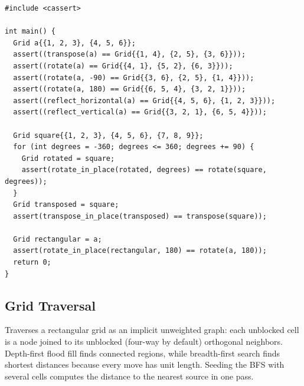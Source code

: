 \begin{lstlisting}[style=cpp]
#include <cassert>

int main() {
  Grid a{{1, 2, 3}, {4, 5, 6}};
  assert((transpose(a) == Grid{{1, 4}, {2, 5}, {3, 6}}));
  assert((rotate(a) == Grid{{4, 1}, {5, 2}, {6, 3}}));
  assert((rotate(a, -90) == Grid{{3, 6}, {2, 5}, {1, 4}}));
  assert((rotate(a, 180) == Grid{{6, 5, 4}, {3, 2, 1}}));
  assert((reflect_horizontal(a) == Grid{{4, 5, 6}, {1, 2, 3}}));
  assert((reflect_vertical(a) == Grid{{3, 2, 1}, {6, 5, 4}}));

  Grid square{{1, 2, 3}, {4, 5, 6}, {7, 8, 9}};
  for (int degrees = -360; degrees <= 360; degrees += 90) {
    Grid rotated = square;
    assert(rotate_in_place(rotated, degrees) == rotate(square, degrees));
  }
  Grid transposed = square;
  assert(transpose_in_place(transposed) == transpose(square));

  Grid rectangular = a;
  assert(rotate_in_place(rectangular, 180) == rotate(a, 180));
  return 0;
}
\end{lstlisting}
\subsection{Grid Traversal}
\label{sec:1.4.2}
Traverses a rectangular grid as an implicit unweighted graph: each unblocked cell is a node joined to its unblocked (four-way by default) orthogonal neighbors. Depth-first flood fill finds connected regions, while breadth-first search finds shortest distances because every move has unit length. Seeding the BFS with several cells computes the distance to the nearest source in one pass.


